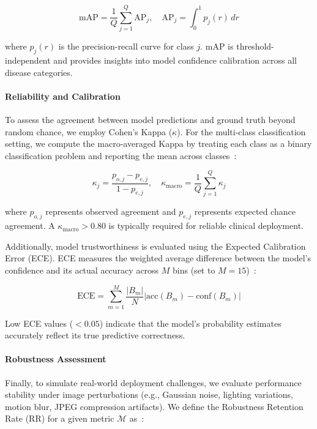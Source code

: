 \begin{equation}
\text{mAP} = \frac{1}{Q} \sum_{j=1}^{Q} \text{AP}_j, \quad \text{AP}_j = \int_{0}^{1} p_j(r) \, dr
\end{equation}

where $p_j(r)$ is the precision-recall curve for class $j$. mAP is threshold-independent and provides insights into model confidence calibration across all disease categories.

\paragraph{Reliability and Calibration}
To assess the agreement between model predictions and ground truth beyond random chance, we employ Cohen's Kappa ($\kappa$). For the multi-class classification setting, we compute the macro-averaged Kappa by treating each class as a binary classification problem and reporting the mean across classes~\cite{powers2011evaluation}:

\begin{equation}
\kappa_j = \frac{p_{o,j} - p_{e,j}}{1 - p_{e,j}}, \quad \kappa_{\text{macro}} = \frac{1}{Q} \sum_{j=1}^{Q} \kappa_j
\end{equation}

where $p_{o,j}$ represents observed agreement and $p_{e,j}$ represents expected chance agreement. A $\kappa_{\text{macro}} > 0.80$ is typically required for reliable clinical deployment.

Additionally, model trustworthiness is evaluated using the Expected Calibration Error (ECE). ECE measures the weighted average difference between the model's confidence and its actual accuracy across $M$ bins (set to $M=15$)~\cite{naeini2015obtaining}:

\begin{equation}
\text{ECE} = \sum_{m=1}^{M} \frac{|B_m|}{N} |\text{acc}(B_m) - \text{conf}(B_m)|
\end{equation}

Low ECE values ($< 0.05$) indicate that the model's probability estimates accurately reflect its true predictive correctness.

\paragraph{Robustness Assessment}
Finally, to simulate real-world deployment challenges, we evaluate performance stability under image perturbations (e.g., Gaussian noise, lighting variations, motion blur, JPEG compression artifacts). We define the Robustness Retention Rate (RR) for a given metric $\mathcal{M}$ as~\cite{hendrycks2019benchmarking}:

